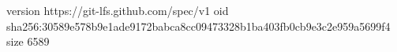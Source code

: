 version https://git-lfs.github.com/spec/v1
oid sha256:30589e578b9e1ade9172babca8cc09473328b1ba403fb0cb9e3c2e959a5699f4
size 6589
